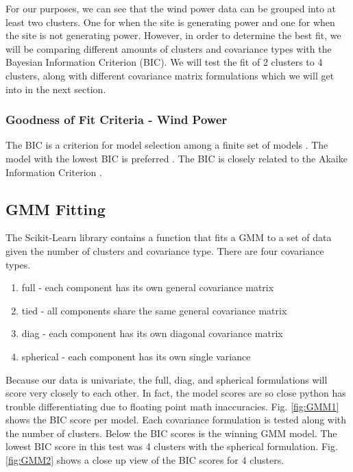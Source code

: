 \documentclass{IEEEtran}
\begin{document}
  For our purposes, we can see that the wind power data can be grouped into at least two clusters. One for when the site is generating power and one for when the site is not generating power. However, in order to determine the best fit, we will be comparing different amounts of clusters and covariance types with the Bayesian Information Criterion (BIC). We will test the fit of 2 clusters to 4 clusters, along with different covariance matrix formulations which we will get into in the next section.

  \subsubsection{Goodness of Fit Criteria - Wind Power}

  The BIC is a criterion for model selection among a finite set of models \cite{BIC}. The model with the lowest BIC is preferred \cite{BIC}. The BIC is closely related to the Akaike Information Criterion \cite{BIC}.

  \subsection{GMM Fitting}

  The Scikit-Learn library contains a function that fits a GMM to a set of data given the number of clusters and covariance type. There are four covariance types.

  \begin{enumerate}
    \item full - each component has its own general covariance matrix
    \item tied - all components share the same general covariance matrix
    \item diag - each component has its own diagonal covariance matrix
    \item spherical - each component has its own single variance
  \end{enumerate}

  Because our data is univariate, the full, diag, and spherical formulations will score very closely to each other. In fact, the model scores are so close python has trouble differentiating due to floating point math inaccuracies. Fig. \ref{fig:GMM1} shows the BIC score per model. Each covariance formulation is tested along with the number of clusters. Below the BIC scores is the winning GMM model. The lowest BIC score in this test was 4 clusters with the spherical formulation. Fig. \ref{fig:GMM2} shows a close up view of the BIC scores for 4 clusters.
\end{document}
